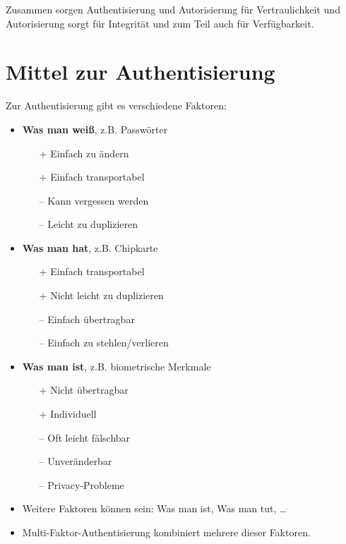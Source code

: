 \documentclass[a4paper, 11pt, accentcolor = tud3b]{tudreport}
\begin{document}
	    Zusammen sorgen Authentisierung und Autorisierung für Vertraulichkeit und Autorisierung sorgt für Integrität und zum Teil auch für Verfügbarkeit.

        \section{Mittel zur Authentisierung}
	        Zur Authentisierung gibt es verschiedene Faktoren:
            \begin{itemize}
            	\item \textbf{Was man weiß}, z.B. Passwörter
	            	\begin{itemize}
	            		\item[+] Einfach zu ändern
	            		\item[+] Einfach transportabel
	            		\item[--] Kann vergessen werden
	            		\item[--] Leicht zu duplizieren
	            	\end{itemize}
            	\item \textbf{Was man hat}, z.B. Chipkarte
	            	\begin{itemize}
	            		\item[+] Einfach transportabel
	            		\item[+] Nicht leicht zu duplizieren
	            		\item[--] Einfach übertragbar
	            		\item[--] Einfach zu stehlen/verlieren
	            	\end{itemize}
            	\item \textbf{Was man ist}, z.B. biometrische Merkmale
	            	\begin{itemize}
	            		\item[+] Nicht übertragbar
	            		\item[+] Individuell
	            		\item[--] Oft leicht fälschbar
	            		\item[--] Unveränderbar
	            		\item[--] Privacy-Probleme
	            	\end{itemize}
            	\item Weitere Faktoren können sein: Was man ist, Was man tut, \dots
            	\item Multi-Faktor-Authentisierung kombiniert mehrere dieser Faktoren.
            \end{itemize}
\end{document}
